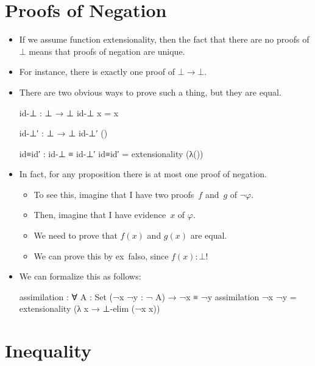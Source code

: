 \documentclass{lecturenotes}
\begin{document}
\section{Proofs of Negation}
\label{sec:proofs-negation}
\begin{itemize}
\item If we assume function extensionality, then the fact that there are no proofs of $\bot$ means that proofs of negation are unique.
\item For instance, there is exactly one proof of $\bot \to \bot$.
\item There are two obvious ways to prove such a thing, but they are equal.
\begin{code}
id-⊥ : ⊥ → ⊥
id-⊥ x = x

id-⊥′ : ⊥ → ⊥
id-⊥′ ()

id≡id′ : id-⊥ ≡ id-⊥′
id≡id′ = extensionality (λ())    
\end{code}
\item In fact, for any proposition there is at most one proof of negation.
  \begin{itemize}
  \item To see this, imagine that I have two proofs~$f$ and~$g$ of $\lnot \varphi$.
  \item Then, imagine that I have evidence~$x$ of $\varphi$.
  \item We need to prove that $f(x)$ and $g(x)$ are equal.
  \item We can prove this by ex~falso, since $f(x) : \bot$!
  \end{itemize}
\item We can formalize this as follows:
\begin{code}
assimilation : ∀ {A : Set} (¬x ¬y : ¬ A) → ¬x ≡ ¬y
assimilation ¬x ¬y = extensionality (λ x → ⊥-elim (¬x x))    
\end{code}
\end{itemize}

\section{Inequality}
\label{sec:inequality}
\end{document}
